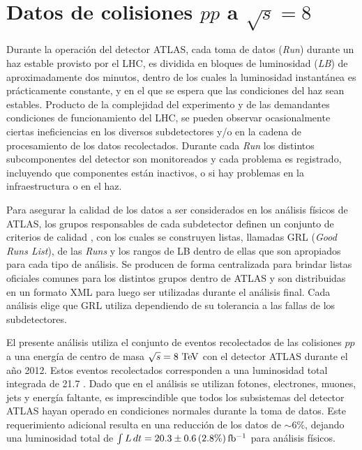 \section{Datos de colisiones $pp$ a $\sqrt{s} = 8$ \tev}

Durante la operación del detector ATLAS, cada toma de datos (\emph{Run}) durante
un haz estable provisto por el LHC, es dividida en bloques de luminosidad
(\emph{LB}) de aproximadamente dos minutos, dentro de los cuales la luminosidad
instantánea es prácticamente constante, y en el que se espera que las
condiciones del haz sean estables. Producto de la complejidad del experimento y
de las demandantes condiciones de funcionamiento del LHC, se pueden observar
ocasionalmente ciertas ineficiencias en los diversos subdetectores y/o en la
cadena de procesamiento de los datos recolectados. Durante cada \emph{Run} los
distintos subcomponentes del detector son monitoreados y cada problema es
registrado, incluyendo que componentes están inactivos, o si hay problemas en
la infraestructura o en el haz.

Para asegurar la calidad de los datos a ser considerados en los análisis físicos
de ATLAS, los grupos responsables de cada subdetector definen un conjunto de
criterios de calidad \cite{GRL}, con los cuales se construyen listas, llamadas
GRL (\emph{Good Runs List}), de las \emph{Runs} y los rangos de LB dentro de ellas que
son apropiados para cada tipo de análisis. Se producen de forma centralizada
para brindar listas oficiales comunes para los distintos grupos dentro de ATLAS
y son distribuidas en un formato \textsc{XML} para luego ser utilizadas durante
el análisis final. Cada análisis elige que GRL utiliza dependiendo de su
tolerancia a las fallas de los subdetectores.

El presente análisis utiliza el conjunto de eventos recolectados de las colisiones
$pp$ a una energía de centro de masa $\sqrt{s} = 8\tev$ con el detector ATLAS
durante el a\~no 2012. Estos eventos recolectados corresponden a una luminosidad
total integrada de 21.7 \ifb. Dado que en el análisis se utilizan fotones, electrones,
muones, jets y energía faltante, es imprescindible que todos los subsistemas
del detector ATLAS hayan operado en condiciones normales durante la toma
de datos. Este requerimiento adicional resulta en una reducción de los datos de
$\sim 6\%$, dejando una luminosidad total de $\int L\, dt = 20.3 \pm 0.6\, (2.8
\%) \, \mbox{fb$^{-1}$}$\cite{lumi2012} para análisis físicos.

